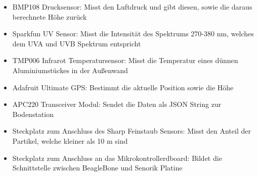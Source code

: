\begin{itemize}
	\item BMP108 Drucksensor: Misst den Luftdruck und gibt diesen, sowie die daraus berechnete Höhe zurück
	\item Sparkfun UV Sensor: Misst die Intensität des Spektrums 270-380 nm, welches dem UVA und UVB Spektrum entspricht
	\item TMP006 Infrarot Temperatursensor: Misst die Temperatur eines dünnen Aluminiumstückes in der Außenwand 
	\item Adafruit Ultimate GPS: Bestimmt die aktuelle Position sowie die Höhe
	\item APC220 Transceiver Modul: Sendet die Daten als JSON String zur Bodenstation
	\item Steckplatz zum Anschluss des Sharp Feinstaub Sensors: Misst den Anteil der Partikel, welche kleiner als 10 \textmu m sind
	\item Steckplatz zum Anschluss an das Mikrokontrollerdboard: Bildet die Schnittstelle zwischen BeagleBone und Senorik Platine
\end{itemize}

